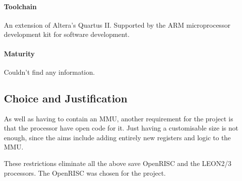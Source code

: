 \paragraph{Toolchain} An extension of Altera's Quartus II. Supported by the ARM microprocessor development kit for software development.
\paragraph{Maturity} Couldn't find any information.

\subsection{Choice and Justification}
As well as having to contain an MMU, another requirement for the project is that the processor have open code for it. Just having a customisable size is not enough, since the aims include adding entirely new registers and logic to the MMU.

These restrictions eliminate all the above save OpenRISC and the LEON2/3 processors. The OpenRISC was chosen for the project.
